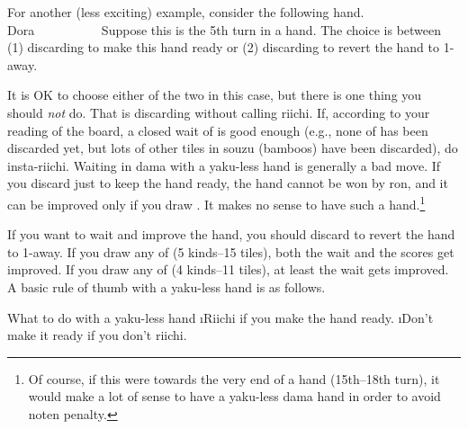 \bigskip

For another (less exciting) example, consider the following hand.
\bp
{}~~\bei\\
\hfill\footnotesize{{\jap Dora}~~~~~~~~~~}
\ep
Suppose this is the 5th turn in a hand. The choice is between (1) discarding {\LARGE{}} to make this hand ready or (2) discarding {\LARGE{}} to revert the hand to 1-away. 

\bigskip
It is OK to choose either of the two in this case, but there is one thing you should \emph{not} do. That is discarding {\LARGE{}} without calling riichi. 
If, according to your reading of the board, a closed wait of {\LARGE{}} is good enough (e.g., none of {\LARGE {}} has been discarded yet, but lots of other tiles in {\jap souzu} (bamboos) have been discarded), do insta-riichi. Waiting in {\jap dama} with a {\jap yaku}-less hand is generally a bad move. If you discard {\LARGE{}} just to keep the hand ready, the hand cannot be won by {\jap ron}, and it can be improved only if you draw {\LARGE{}}. It makes no sense to have such a hand.\footnote{Of course, if this were towards the very end of a hand (15th--18th turn), it would make a lot of sense to have a {\jap yaku}-less {\jap dama} hand in order to avoid {\jap noten} penalty.} 

\bigskip
If you want to wait and improve the hand, you should discard {\LARGE{}} to revert the hand to 1-away. If you draw any of {\LARGE{}} (5 kinds--15 tiles), both the wait and the scores get improved. If you draw any of {\LARGE{}} (4 kinds--11 tiles), at least the wait gets improved. 
A basic rule of thumb with a {\jap yaku}-less hand is as follows.

\bigskip

\begin{itembox}[c]{What to do with a {\jap yaku}-less hand}
\bi
\i Riichi if you make the hand ready.
\i Don't make it ready if you don't riichi.
\vsps
\ei
\end{itembox}

